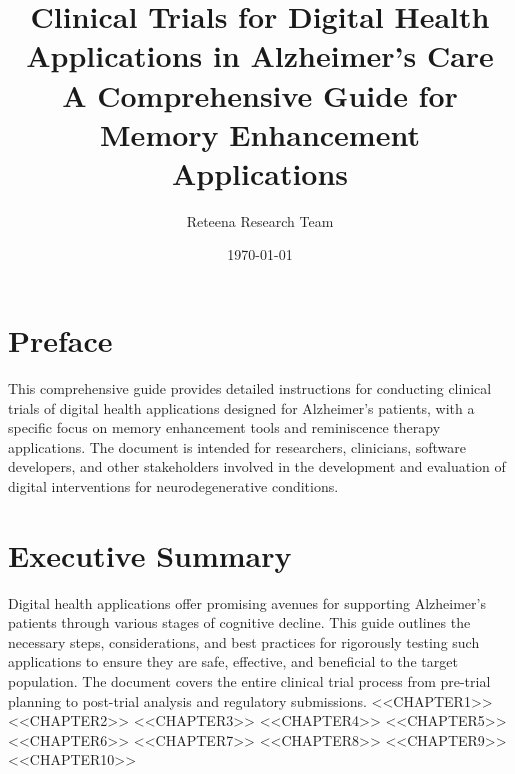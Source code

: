 \documentclass[12pt,a4paper]{book}
\title{\Huge \textbf{Clinical Trials for Digital Health Applications in Alzheimer's Care} \\ \vspace{0.5cm}
\Large A Comprehensive Guide for Memory Enhancement Applications}
\author{Reteena Research Team}
\date{\today}
\begin{document}
\frontmatter
\maketitle
\tableofcontents
\listoffigures
\listoftables
\chapter*{Preface}
This comprehensive guide provides detailed instructions for conducting clinical trials of digital health applications designed for Alzheimer's patients, with a specific focus on memory enhancement tools and reminiscence therapy applications. The document is intended for researchers, clinicians, software developers, and other stakeholders involved in the development and evaluation of digital interventions for neurodegenerative conditions.

\chapter*{Executive Summary}
Digital health applications offer promising avenues for supporting Alzheimer's patients through various stages of cognitive decline. This guide outlines the necessary steps, considerations, and best practices for rigorously testing such applications to ensure they are safe, effective, and beneficial to the target population. The document covers the entire clinical trial process from pre-trial planning to post-trial analysis and regulatory submissions.
\mainmatter
<<CHAPTER1>>
<<CHAPTER2>>
<<CHAPTER3>>
<<CHAPTER4>>
<<CHAPTER5>>
<<CHAPTER6>>
<<CHAPTER7>>
<<CHAPTER8>>
<<CHAPTER9>>
<<CHAPTER10>>
\backmatter
\end{document}
